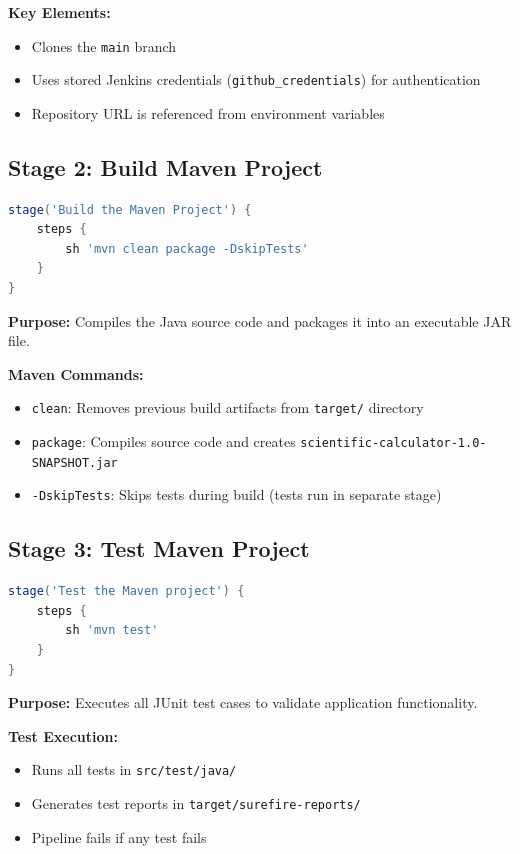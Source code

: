 \documentclass[12pt,a4paper]{article}
\begin{document}
\textbf{Key Elements:}
\begin{itemize}
    \item Clones the \texttt{main} branch
    \item Uses stored Jenkins credentials (\texttt{github\_credentials}) for authentication
    \item Repository URL is referenced from environment variables
\end{itemize}

\subsection{Stage 2: Build Maven Project}

\begin{lstlisting}[language=Groovy, caption=Maven Build Stage]
stage('Build the Maven Project') {
    steps {
        sh 'mvn clean package -DskipTests'
    }
}
\end{lstlisting}

\textbf{Purpose:} Compiles the Java source code and packages it into an executable JAR file.

\textbf{Maven Commands:}
\begin{itemize}
    \item \texttt{clean}: Removes previous build artifacts from \texttt{target/} directory
    \item \texttt{package}: Compiles source code and creates \texttt{scientific-calculator-1.0-SNAPSHOT.jar}
    \item \texttt{-DskipTests}: Skips tests during build (tests run in separate stage)
\end{itemize}

\subsection{Stage 3: Test Maven Project}

\begin{lstlisting}[language=Groovy, caption=Maven Test Stage]
stage('Test the Maven project') {
    steps {
        sh 'mvn test'
    }
}
\end{lstlisting}

\textbf{Purpose:} Executes all JUnit test cases to validate application functionality.

\textbf{Test Execution:}
\begin{itemize}
    \item Runs all tests in \texttt{src/test/java/}
    \item Generates test reports in \texttt{target/surefire-reports/}
    \item Pipeline fails if any test fails
\end{itemize}
\end{document}

